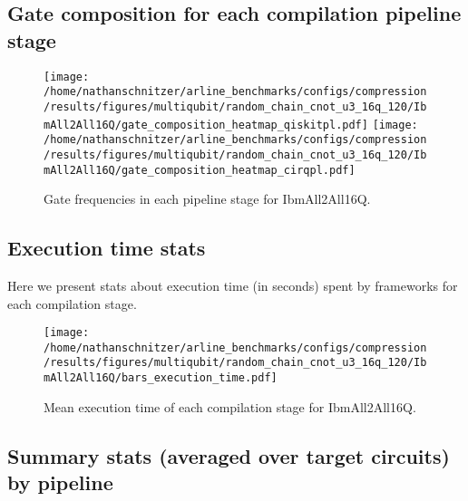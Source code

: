 \documentclass{report}%
\begin{document}
%
\clearpage%
\subsection*{Gate composition for each compilation pipeline stage}%
\label{subsec:Gatecompositionforeachcompilationpipelinestage}%

%


\begin{figure}[h!]%
\centering%
\texttt{[image: /home/nathanschnitzer/arline\_benchmarks/configs/compression/results/figures/multiqubit/random\_chain\_cnot\_u3\_16q\_120/IbmAll2All16Q/gate\_composition\_heatmap\_qiskitpl.pdf]}%
\centering%
\texttt{[image: /home/nathanschnitzer/arline\_benchmarks/configs/compression/results/figures/multiqubit/random\_chain\_cnot\_u3\_16q\_120/IbmAll2All16Q/gate\_composition\_heatmap\_cirqpl.pdf]}%
\linebreak%
\caption{Gate frequencies in each pipeline stage for IbmAll2All16Q.}%
\end{figure}

%
\subsection*{Execution time stats }%
\label{subsec:Executiontimestats}%

%
Here we present stats about execution time (in seconds)
                spent by frameworks for each compilation stage.%


\begin{figure}[h!]%
\centering%
\texttt{[image: /home/nathanschnitzer/arline\_benchmarks/configs/compression/results/figures/multiqubit/random\_chain\_cnot\_u3\_16q\_120/IbmAll2All16Q/bars\_execution\_time.pdf]}%
\caption{Mean execution time of each compilation stage for IbmAll2All16Q.}%
\end{figure}

%
\subsection*{Summary stats (averaged over target circuits) by pipeline}%
\label{subsec:Summarystats(averagedovertargetcircuits)bypipeline}%
\end{document}
